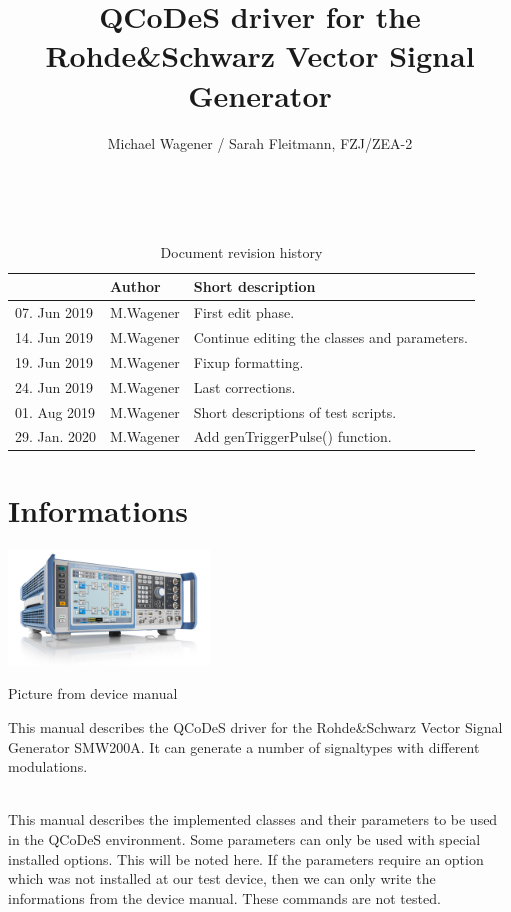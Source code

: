 \documentclass[11pt]{article} %
\title{QCoDeS driver for the Rohde\&Schwarz Vector Signal Generator \newline {\it User documentation}}
\author{Michael Wagener / Sarah Fleitmann, FZJ/ZEA-2}
\begin{document}
\maketitle

\tableofcontents %

\ \\

\begin{longtable}{|p{2.7cm}|p{2.6cm}|p{10.3cm}|}
\caption{Document revision history} \\
\hline\rowcolor{rowcolor}{\bf Date} & {\bf Author} & {\bf Short description} \\
\endfirsthead
\hline
07. Jun 2019 & M.Wagener & First edit phase. \\ \hline
14. Jun 2019 & M.Wagener & Continue editing the classes and parameters. \\ \hline
19. Jun 2019 & M.Wagener & Fixup formatting. \\ \hline
24. Jun 2019 & M.Wagener & Last corrections. \\ \hline
01. Aug 2019 & M.Wagener & Short descriptions of test scripts. \\ \hline
29. Jan. 2020 & M.Wagener & Add genTriggerPulse() function. \\ \hline
\end{longtable}


\clearpage

\section{Informations}

\begin{floatingfigure}[r]{0.42\textwidth}
\mbox{\includegraphics[width=0.4\textwidth]{DeviceFromHandbook.png}}
\caption{Picture from device manual}
\end{floatingfigure}
This manual describes the QCoDeS driver for the Rohde\&Schwarz Vector Signal Generator SMW200A.
It can generate a number of signaltypes with different modulations.

\ \\

This manual describes the implemented classes and their parameters to be used	 in the QCoDeS environment. Some parameters can only be used with special installed options. This will be noted here. If the parameters require an option which was not installed at our test device, then we can only write the informations from the device manual. These commands are not tested.
\end{document}

